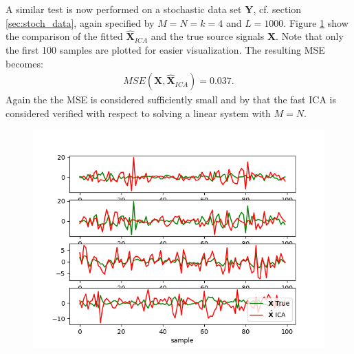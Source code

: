 A similar test is now performed on a stochastic data set  $\textbf{Y}$, cf. section \ref{sec:stoch_data}, again specified by $M=N=k=4$ and $L=1000$. 
Figure \ref{fig:appica3} show the comparison of the fitted $\hat{\textbf{X}}_{ICA}$ and the true source signals $\textbf{X}$. Note that only the first 100 samples are plotted for easier visualization. The resulting MSE becomes:
\begin{align*}
MSE(\textbf{X},\hat{\textbf{X}}_{ICA}) = 0.037.
\end{align*}       
Again the the MSE is considered sufficiently small and by that the fast ICA is considered verified with respect to solving a linear system with $M=N$. 
\begin{figure}[H]
	\centering
	\includegraphics[scale=0.5]{figures/ICAapp/ICA_app3.png}
	\caption{}
	\label{fig:appica3}
\end{figure}

